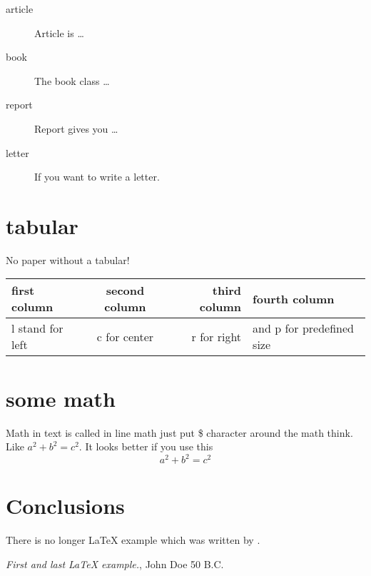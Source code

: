 	\begin{description}
		\item[article\label{article}]{Article is \ldots}
		\item[book\label{book}]{The book class \ldots}
		\item[report\label{report}]{Report gives you \ldots}
		\item[letter\label{letter}]{If you want to write a letter.}
	\end{description}
	
	\section{tabular}
	No paper without a tabular!
	
	\begin{tabular}{|l|c|r|p{2cm}|}
		\hline
		first column & second column & third column & fourth column \\
		\hline 
		l stand for left & c for center & r for right & and p for predefined size \\
		\hline 
	\end{tabular} 
	
	
	\section{some math}
	Math in text is called in line math just put \$ character around 
	the math think. Like $ a^2 + b^2 = c^2 $. It looks better if you use 
	this 
	\[a^2 + b^2 = c^2\]
	
	\section{Conclusions}\label{conclusions}
	There is no longer \LaTeX{} example which was written by \cite{doe}.
	
	\begin{thebibliography}{9}
		 \emph{First and last \LaTeX{} example.},
		John Doe 50 B.C. 
	\end{thebibliography}